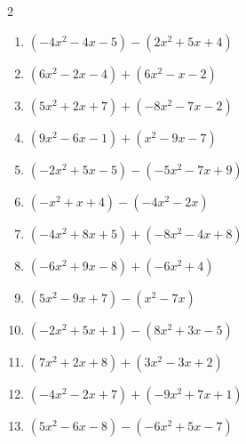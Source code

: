 \begin{multicols}{2}
\begin{enumerate}

  \item $(-4x^{2}-4x-5)-(2x^{2}+5x+4)$


  \item $(6x^{2}-2x-4)+(6x^{2}-x-2)$


  \item $(5x^{2}+2x+7)+(-8x^{2}-7x-2)$


  \item $(9x^{2}-6x-1)+(x^{2}-9x-7)$


  \item $(-2x^{2}+5x-5)-(-5x^{2}-7x+9)$


  \item $(-x^{2}+x+4)-(-4x^{2}-2x)$


  \item $(-4x^{2}+8x+5)+(-8x^{2}-4x+8)$


  \item $(-6x^{2}+9x-8)+(-6x^{2}+4)$


  \item $(5x^{2}-9x+7)-(x^{2}-7x)$


  \item $(-2x^{2}+5x+1)-(8x^{2}+3x-5)$


  \item $(7x^{2}+2x+8)+(3x^{2}-3x+2)$


  \item $(-4x^{2}-2x+7)+(-9x^{2}+7x+1)$


  \item $(5x^{2}-6x-8)-(-6x^{2}+5x-7)$



\end{enumerate}
\end{multicols}
